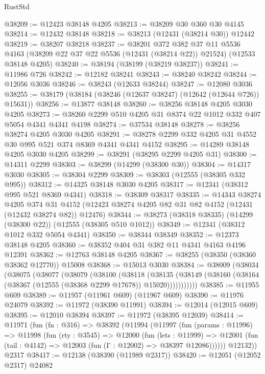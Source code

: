 \begin{lexlean}{RustStd}
\begin{coremodule}
@38209 := @12423 @38148 @4205
@38213 := @38209 @30 @360 @30 @4145
@38214 := @12432 @38148
@38218 := @38213 (@12431 (@38214 @30)) @12442
@38219 := @38207 @38218
@38237 := @38201
    @372
    @382
    @37
    @11
    @5536
    @4163
    (@38209 @22 @37 @22 @5536 (@12431 (@38214 @22)) @21524)
    (@12533 @38148 @4205)
@38240 := @38194 (@38199 (@38219 @38237))
@38241 := @11986 @726
@38242 := @12182 @38241
@38243 := @38240 @38242
@38244 := @12056 @3036
@38246 := @38243 (@12633 @38244)
@38247 := @12080 @3036
@38255 := @38179 (@38184 (@38246 (@12637 @38247) (@12642 (@12644 @726)) @15631))
@38256 := @13877 @38148
@38260 := @38256 @38148 @4205 @3030 @4205
@38273 := @38260 @2299 @510 @4205 @31 @8374 @22 @1012 @332 @407 @5054 @4341 @4341 @4198
@38274 := @37534 @38148
@38278 := @38256 @38274 @4205 @3030 @4205
@38291 := @38278 @2299 @332 @4205 @31 @4552 @30 @995 @521 @374 @8369 @4341 @4341 @4152
@38295 := @14289 @38148 @4205 @3030 @4205
@38299 := @38291 (@38295 @2299 @4205 @31)
@38300 := @14311 @2299
@38303 := @38299 (@14299 (@38300 @30))
@38304 := @14317 @3030
@38305 := @38304 @2299
@38309 := @38303 (@12555 (@38305 @332 @995))
@38312 := @14325 @38148 @3030 @4205
@38317 := @12341 (@38312 @995 @521 @8369 @4341)
@38318 := @38309 @38317
@38335 := @14343
    @38274
    @4205
    @374
    @31
    @4152
    (@12423 @38274 @4205 @82 @31 @82 @4152 (@12431 (@12432 @38274 @82)) @12476)
@38344 := @38273 (@38318 @38335) (@14299 (@38300 @22)) (@12555 (@38305 @510 @1012))
@38349 := @12341 (@38312 @1012 @332 @5054 @4341)
@38350 := @38344 @38349
@38352 := @12373 @38148 @4205
@38360 := @38352 @404 @31 @382 @11 @4341 @4163 @4196 @12391
@38362 := @12763 @38148 @4205
@38367 := @38255 (@38350 (@38360 @38362 @12770)) @15008
@38368 := @15013 @3030
@38384 := @38009
    (@38034
      (@38075
        (@38077
          (@38079
            (@38100
              (@38118
                (@38135
                  (@38149 (@38160 (@38164 (@38367 (@12555 (@38368 @2299 @17678)) @15020)))))))))))
@38385 := @11955 @609
@38389 := @11957 (@11961 @609) (@11967 @609)
@38390 := @11976 @24079
@38392 := @11972 (@38390 @11991)
@38394 := @12014 (@12015 @609)
@38395 := @12010 @38394
@38397 := @11972 (@38395 @12039)
@38414 := @11971
    (fun (fn : @316) =>
    @38392
      (@11994
        (@11997
          (fun (params : @11996) =>
          @11998
            (fun (rty : @3545) =>
            @12000
              (fun (lets : @11999) =>
              @12001 (fun (tail : @4142) => @12003 (fun (Γ : @12002) => @38397 @12086))))))
        @12132))
    @2317
@38417 := @12138 (@38390 (@11989 @2317))
@38420 := @12051 (@12052 @2317) @24082

\end{coremodule}
\end{lexlean}
